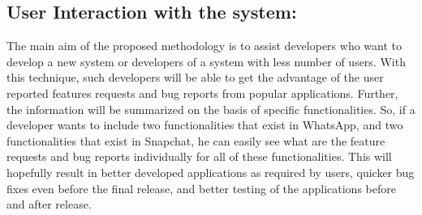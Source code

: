 \subsection{User Interaction with the system:}

	The main aim of the proposed methodology is to assist developers who want to develop a new
system or developers of a system with less number of users. With this technique, such
developers will be able to get the advantage of the user reported features requests and bug reports
from popular applications. Further, the information will be summarized on the basis of specific
functionalities. So, if a developer wants to include two functionalities that exist in WhatsApp,
and two functionalities that exist in Snapchat, he can easily see what are the feature requests
and bug reports individually for all of these functionalities. This will hopefully result in better
developed applications as required by users, quicker bug fixes even before the final release, and
better testing of the applications before and after release.
